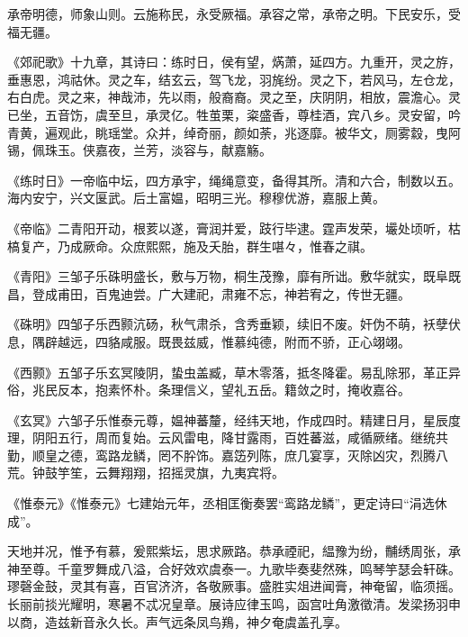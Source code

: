 \documentclass[12pt,UTF8]{ctexbook}
\begin{document}
承帝明德，师象山则。云施称民，永受厥福。承容之常，承帝之明。下民安乐，受福无疆。



《郊祀歌》十九章，其诗曰：练时日，侯有望，焫萧，延四方。九重开，灵之斿，垂惠恩，鸿祜休。灵之车，结玄云，驾飞龙，羽旄纷。灵之下，若风马，左仓龙，右白虎。灵之来，神哉沛，先以雨，般裔裔。灵之至，庆阴阴，相放，震澹心。灵已坐，五音饬，虞至旦，承灵亿。牲茧栗，粢盛香，尊桂酒，宾八乡。灵安留，吟青黄，遍观此，眺瑶堂。众并，绰奇丽，颜如荼，兆逐靡。被华文，厕雾縠，曳阿锡，佩珠玉。侠嘉夜，兰芳，淡容与，献嘉觞。



《练时日》一帝临中坛，四方承宇，绳绳意变，备得其所。清和六合，制数以五。海内安宁，兴文匽武。后土富媪，昭明三光。穆穆优游，嘉服上黄。



《帝临》二青阳开动，根荄以遂，膏润并爱，跂行毕逮。霆声发荣，壧处顷听，枯槁复产，乃成厥命。众庶熙熙，施及夭胎，群生啿々，惟春之祺。



《青阳》三邹子乐硃明盛长，敷与万物，桐生茂豫，靡有所诎。敷华就实，既阜既昌，登成甫田，百鬼迪尝。广大建祀，肃雍不忘，神若宥之，传世无疆。



《硃明》四邹子乐西颢沆砀，秋气肃杀，含秀垂颖，续旧不废。奸伪不萌，袄孽伏息，隅辟越远，四貉咸服。既畏兹威，惟慕纯德，附而不骄，正心翊翊。



《西颢》五邹子乐玄冥陵阴，蛰虫盖臧，草木零落，抵冬降霍。易乱除邪，革正异俗，兆民反本，抱素怀朴。条理信义，望礼五岳。籍敛之时，掩收嘉谷。



《玄冥》六邹子乐惟泰元尊，媪神蕃釐，经纬天地，作成四时。精建日月，星辰度理，阴阳五行，周而复始。云风雷电，降甘露雨，百姓蕃滋，咸循厥绪。继统共勤，顺皇之德，鸾路龙鳞，罔不肸饰。嘉笾列陈，庶几宴享，灭除凶灾，烈腾八荒。钟鼓竽笙，云舞翔翔，招摇灵旗，九夷宾将。



《惟泰元》《惟泰元》七建始元年，丞相匡衡奏罢“鸾路龙鳞”，更定诗曰“涓选休成”。



天地并况，惟予有慕，爰熙紫坛，思求厥路。恭承禋祀，緼豫为纷，黼绣周张，承神至尊。千童罗舞成八溢，合好效欢虞泰一。九歌毕奏斐然殊，鸣琴竽瑟会轩硃。璆磬金鼓，灵其有喜，百官济济，各敬厥事。盛胜实俎进闻膏，神奄留，临须摇。长丽前掞光耀明，寒暑不忒况皇章。展诗应律玉鸣，函宫吐角激徵清。发梁扬羽申以商，造兹新音永久长。声气远条凤鸟鴹，神夕奄虞盖孔享。
\end{document}
